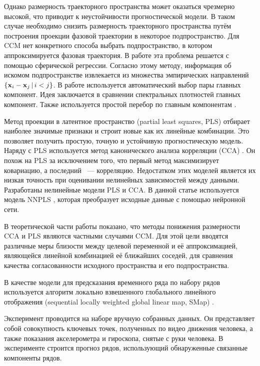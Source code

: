 \documentclass[a4paper, 12pt]{article}
\begin{document}
Однако размерность траекторного пространства может оказаться чрезмерно высокой, что приводит к неустойчивости прогностической модели.
В таком случае необходимо снизить размерность траекторного пространства путём построения проекции фазовой траектории в некоторое подпространство. Для CCM нет конкретного способа выбрать подпространство, в котором аппроксимируется фазовая траектория.
В работе \citep{usmanova2020sphere_regr} эта проблема решается с помощью сферической регрессии. Согласно этому методу, информация об искомом подпространстве извлекается из множества эмпирических направлений $\{ \mathbf{x}_i - \mathbf{x}_j\, | \, i < j \}$.
В работе \citep{alexandrov2005automatic} используется автоматический выбор пары главных компонент. Идея заключается в сравнении спектральных плотностей главных компонент. Также используется простой перебор по главным компонентам \citep{usmanova2019dependencies}.

Метод проекции в латентное пространство (partial least squares, PLS) \citep{rosipal2011nonlinear, rosipal2005overview} отбирает наиболее значимые признаки и строит новые как их линейные комбинации. 
Это позволяет получить простую, точную и устойчивую прогностическую модель.
Наряду с PLS используется метод канонического анализа корреляции (CCA) \citep{hardoon2004canonical}. 
Он похож на PLS за исключением того, что первый метод максимизирует ковариацию, а последний ~--- корреляцию. 
Недостатком этих моделей является их низкая точность при оценивании нелинейных зависимостей между данными.
Разработаны нелинейные модели PLS\citep{qin1992nonlinear, hiden1998non} и CCA\citep{lai2000kernel, andrew2013deep}.
В данной статье используется модель NNPLS \citep{bulut2014new}, которая преобразует исходные данные с помощью нейронной сети. 

В теоретической части работы показано, что методы понижения размерности CCA и PLS являются частными случаями CCM. 
Для этой цели вводятся различные меры близости между целевой переменной и её аппроксимацией, являющейся линейной комбинацией её ближайших соседей, для сравнения качества согласованности исходного пространства и его подпространства.

В качестве модели для предсказания временного ряда по набору рядов используется алгоритм локально взвешенного глобального линейного отображения (sequential locally weighted global linear map, SMap) \citep{sugihara1994nonlinear}.

Эксперимент проводится на наборе вручную собранных данных. Он представляет собой совокупность ключевых точек, полученных 
по видео движения человека, а также показания акселерометра и гироскопа, снятые с руки человека. 
В эксперименте строится прогноз рядов, использующий обнаруженные связанные компоненты рядов.
\end{document}

